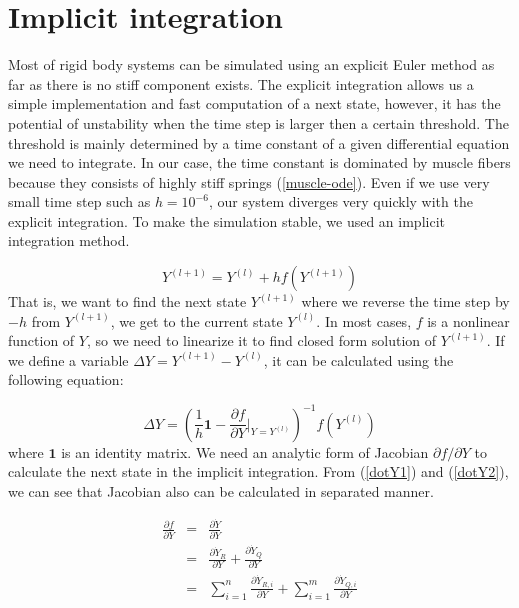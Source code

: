 \documentclass[a4paper,10pt]{article}
\begin{document}
\section{Implicit integration}

Most of rigid body systems can be simulated using an explicit Euler method
as far as there is no stiff component exists. The explicit integration
allows us a simple implementation and fast computation of a next state,
however, it has the potential of unstability when the time step is larger
then a certain threshold. The threshold is mainly determined by a time
constant of a given differential equation we need to integrate. In our case, the time
constant is dominated by muscle fibers because they consists
of highly stiff springs (\ref{muscle-ode}). Even if we use very small time step
such as $h=10^{-6}$, our system diverges very quickly with the explicit
integration. To make the simulation stable, we used an implicit integration
method.

\begin{equation}
Y^{(l+1)}=Y^{(l)}+hf(Y^{(l+1)})
\end{equation}
That is, we want to find the next state $Y^{(l+1)}$ where we
reverse the time step by $-h$ from $Y^{(l+1)}$, we get to the current state
$Y^{(l)}$. In most cases, $f$ is a nonlinear function of $Y$, so we need to
linearize it to find closed form solution of $Y^{(l+1)}$. If we define a
variable $\Delta Y = Y^{(l+1)}-Y^{(l)}$, it can be calculated using the
following equation:

\begin{equation}
\Delta Y = \left(  \frac{1}{h}\mathbf{1} - {\frac{\partial f}{\partial Y} \bigg|_{Y=Y^{(l)}}}\right)^{-1} f(Y^{(l)})
\end{equation}
where $\mathbf{1}$ is an identity matrix. We need an analytic form of
Jacobian $\partial f / \partial Y$ to calculate the next state in the
implicit integration. From (\ref{dotY1}) and (\ref{dotY2}), we can see that
Jacobian also can be calculated in separated manner.

\begin{eqnarray*}
\frac{\partial f}{\partial Y}
        & = & \frac{\partial\dot{Y}}{\partial Y}\\
        & = & \frac{\partial\dot{Y}_R}{\partial Y} + \frac{\partial\dot{Y}_Q}{\partial Y}\\
        & = & \sum_{i=1}^{n}\frac{\partial\dot{Y}_{R,i}}{\partial Y} + \sum_{i=1}^{m}\frac{\partial\dot{Y}_{Q,i}}{\partial Y}
\end{eqnarray*}
\end{document}
